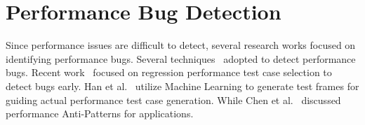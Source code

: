 \section{Performance Bug Detection}
\label{sec:detection}
Since performance issues are difficult to detect, several research works focused on identifying performance bugs. Several techniques~\cite{Siegmund2012, Killian2010, Yan2012} adopted to detect performance bugs. Recent work~\cite{Mostafa2017} focused on regression performance test case selection to detect bugs early. Han et al.~\cite{Han2018} utilize Machine Learning to generate test frames for guiding actual performance test case generation. While Chen et al.~\cite{Chen2014} discussed performance Anti-Patterns for applications.


